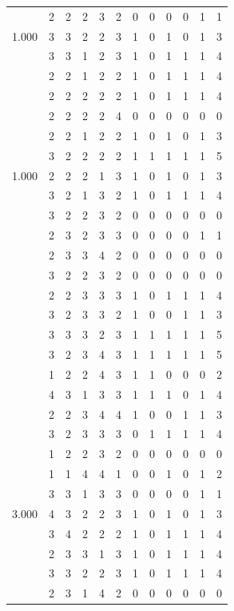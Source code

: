 \documentclass[]{book}
\theoremstyle{definition}
\theoremstyle{definition}
\theoremstyle{definition}
\theoremstyle{remark}
\begin{document}
\begin{table}
{\begin{tabular}[t]{rrrrrrrrrrrr}
 & 2 & 2 & 2 & 3 & 2 & 0 & 0 & 0 & 0 & 1 & 1\\
1.000 & 3 & 3 & 2 & 2 & 3 & 1 & 0 & 1 & 0 & 1 & 3\\
 & 3 & 3 & 1 & 2 & 3 & 1 & 0 & 1 & 1 & 1 & 4\\
 & 2 & 2 & 1 & 2 & 2 & 1 & 0 & 1 & 1 & 1 & 4\\
 & 2 & 2 & 2 & 2 & 2 & 1 & 0 & 1 & 1 & 1 & 4\\
 & 2 & 2 & 2 & 2 & 4 & 0 & 0 & 0 & 0 & 0 & 0\\
 & 2 & 2 & 1 & 2 & 2 & 1 & 0 & 1 & 0 & 1 & 3\\
 & 3 & 2 & 2 & 2 & 2 & 1 & 1 & 1 & 1 & 1 & 5\\
1.000 & 2 & 2 & 2 & 1 & 3 & 1 & 0 & 1 & 0 & 1 & 3\\
 & 3 & 2 & 1 & 3 & 2 & 1 & 0 & 1 & 1 & 1 & 4\\
 & 3 & 2 & 2 & 3 & 2 & 0 & 0 & 0 & 0 & 0 & 0\\
 & 2 & 3 & 2 & 3 & 3 & 0 & 0 & 0 & 0 & 1 & 1\\
 & 2 & 3 & 3 & 4 & 2 & 0 & 0 & 0 & 0 & 0 & 0\\
 & 3 & 2 & 2 & 3 & 2 & 0 & 0 & 0 & 0 & 0 & 0\\
 & 2 & 2 & 3 & 3 & 3 & 1 & 0 & 1 & 1 & 1 & 4\\
 & 3 & 2 & 3 & 3 & 2 & 1 & 0 & 0 & 1 & 1 & 3\\
 & 3 & 3 & 3 & 2 & 3 & 1 & 1 & 1 & 1 & 1 & 5\\
 & 3 & 2 & 3 & 4 & 3 & 1 & 1 & 1 & 1 & 1 & 5\\
 & 1 & 2 & 2 & 4 & 3 & 1 & 1 & 0 & 0 & 0 & 2\\
 & 4 & 3 & 1 & 3 & 3 & 1 & 1 & 1 & 0 & 1 & 4\\
 & 2 & 2 & 3 & 4 & 4 & 1 & 0 & 0 & 1 & 1 & 3\\
 & 3 & 2 & 3 & 3 & 3 & 0 & 1 & 1 & 1 & 1 & 4\\
 & 1 & 2 & 2 & 3 & 2 & 0 & 0 & 0 & 0 & 0 & 0\\
 & 1 & 1 & 4 & 4 & 1 & 0 & 0 & 1 & 0 & 1 & 2\\
 & 3 & 3 & 1 & 3 & 3 & 0 & 0 & 0 & 0 & 1 & 1\\
3.000 & 4 & 3 & 2 & 2 & 3 & 1 & 0 & 1 & 0 & 1 & 3\\
 & 3 & 4 & 2 & 2 & 2 & 1 & 0 & 1 & 1 & 1 & 4\\
 & 2 & 3 & 3 & 1 & 3 & 1 & 0 & 1 & 1 & 1 & 4\\
 & 3 & 3 & 2 & 2 & 3 & 1 & 0 & 1 & 1 & 1 & 4\\
 & 2 & 3 & 1 & 4 & 2 & 0 & 0 & 0 & 0 & 0 & 0\\

\end{tabular}}
\end{table}
\end{document}
